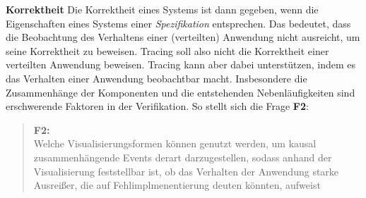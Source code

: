 \textbf{Korrektheit} \space\space\space Die Korrektheit eines Systems ist dann gegeben, wenn die Eigenschaften eines Systems einer \emph{Spezifikation} entsprechen. Das bedeutet, dass die Beobachtung des Verhaltens einer (verteilten) Anwendung nicht ausreicht, um seine Korrektheit zu beweisen. Tracing soll also nicht die Korrektheit einer verteilten Anwendung beweisen. Tracing kann aber dabei unterstützen, indem es das Verhalten einer Anwendung beobachtbar macht. Insbesondere die Zusammenhänge der Komponenten und die entstehenden Nebenläufigkeiten sind erschwerende Faktoren in der Verifikation. So stellt sich die Frage \textbf{F2}:

\begin{quote}
	\cbstart
	\textbf{F2:}\\
	Welche Visualisierungsformen können genutzt werden, um kausal zusammenhängende Events derart darzugestellen, sodass anhand der Visualisierung feststellbar ist, ob das Verhalten der Anwendung starke Ausreißer, die auf Fehlimplmenentierung deuten könnten, aufweist
	\cbend
\end{quote}

